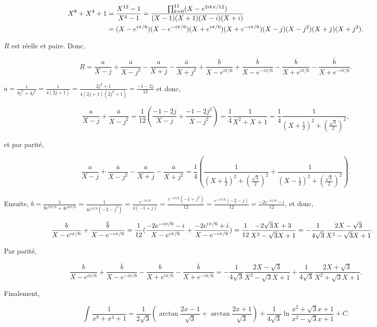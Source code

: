 \documentclass[11pt,a4paper]{article}
\newcommand{\Arctan}{\mathop{\mathrm{arctan}}\nolimits}
\begin{document}
\begin{enumerate}
\begin{align*}\ensuremath
X^8+X^4+1&=\frac{X^{12}-1}{X^4-1}=\frac{\prod_{k=0}^{11}(X-e^{2ik\pi/12})}{(X-1)(X+1)(X-i)(X+i)}\\
 &=(X-e^{i\pi/6})(X-e^{-i\pi/6})(X+e^{i\pi/6})(X+e^{-i\pi/6})(X-j)(X-j^2)(X+j)(X+j^2).
\end{align*}

$R$ est réelle et paire. Donc,

$$R=\frac{a}{X-j}+\frac{\overline{a}}{X-j^2}-\frac{a}{X+j}-\frac{\overline{a}}{X+j^2}+\frac{b}{X-e^{i\pi/6}}
+\frac{\overline{b}}{X-e^{-i\pi/6}}-\frac{b}{X+e^{i\pi/6}}-\frac{\overline{b}}{X+e^{-i\pi/6}}.$$

$a=\frac{1}{8j^7+4j^3}=\frac{1}{4(2j+1)}=\frac{2j^2+1}{4(2j+1)(2j^2+1)}=\frac{-1-2j}{12}$ et donc,

$$\frac{a}{X-j}+\frac{\overline{a}}{X-j^2}=\frac{1}{12}(\frac{-1-2j}{X-j}+\frac{-1-2j^2}{X-j^2})
=\frac{1}{4}\frac{1}{X^2+X+1}=\frac{1}{4}\frac{1}{(X+\frac{1}{2})^2+(\frac{\sqrt{3}}{2})^2},$$

 et par parité,
 
$$\frac{a}{X-j}+\frac{\overline{a}}{X-j^2}-\frac{a}{X+j}-\frac{\overline{a}}{X+j^2}=
\frac{1}{4}(\frac{1}{(X+\frac{1}{2})^2+(\frac{\sqrt{3}}{2})^2}+\frac{1}{(X-\frac{1}{2})^2+(\frac{\sqrt{3}}{2})^2}).$$

Ensuite, $b=\frac{1}{8e^{7i\pi/6}+4e^{3i\pi/6}}=\frac{1}{4e^{i\pi/6}(-2-j^2)}=\frac{e^{-i\pi/6}}{4(-1+j)}
=\frac{e^{-i\pi/6}(-1+j^2)}{12}=\frac{e^{-i\pi/6}(-2-j)}{12}=\frac{-2e^{-i\pi/6}-i}{12}$, et donc,

\begin{align*}\ensuremath
\frac{b}{X-e^{i\pi/6}}
+\frac{\overline{b}}{X-e^{-i\pi/6}}&=\frac{1}{12}(\frac{-2e^{-i\pi/6}-i}{X-e^{i\pi/6}}+\frac{-2e^{i\pi/6}+i}{X-e^{-i\pi/6}})=\frac{1}{12}\frac{-2\sqrt{3}X+3}{X^2-\sqrt{3}X+1}=-\frac{1}{4\sqrt{3}}\frac{2X-\sqrt{3}}{X^2-\sqrt{3}X+1}.
\end{align*}

Par parité,

$$\frac{b}{X-e^{i\pi/6}}
+\frac{\overline{b}}{X-e^{-i\pi/6}}-\frac{b}{X+e^{i\pi/6}}-\frac{\overline{b}}{X+e^{-i\pi/6}}=
-\frac{1}{4\sqrt{3}}\frac{2X-\sqrt{3}}{X^2-\sqrt{3}X+1}+\frac{1}{4\sqrt{3}}\frac{2X+\sqrt{3}}{X^2+\sqrt{3}X+1}.$$

Finalement,

$$\int_{}^{}\frac{1}{x^8+x^4+1}=\frac{1}{2\sqrt{3}}(\Arctan\frac{2x-1}{\sqrt{3}}+\Arctan\frac{2x+1}{\sqrt{3}})+\frac{1}{4\sqrt{3}}\ln\frac{x^2+\sqrt{3}x+1}{x^2-\sqrt{3}x+1}+C.$$


\end{enumerate}
\end{document}
